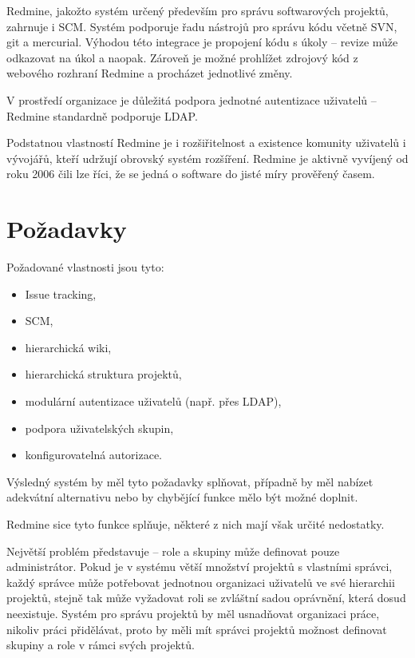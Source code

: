 \documentclass[thesis=B,czech]{FITthesis}[2012/05/02]
\begin{document}
Redmine, jakožto systém určený především pro správu softwarových
projektů, zahrnuje i \gls{SCM}. Systém podporuje řadu nástrojů pro
správu kódu včetně \gls{SVN}, \gls{git} a \gls{mercurial}. Výhodou této
integrace je propojení kódu s úkoly -- revize může odkazovat na úkol a
naopak. Zároveň je možné prohlížet zdrojový kód z webového rozhraní
Redmine a procházet jednotlivé změny.

V prostředí organizace je důležitá podpora jednotné autentizace
uživatelů -- Redmine standardně podporuje \gls{LDAP}.

Podstatnou vlastností Redmine je i rozšiřitelnost a existence komunity
uživatelů i vývojářů, kteří udržují obrovský systém rozšíření. Redmine
je aktivně vyvíjený od roku 2006 čili lze říci, že se jedná o software
do jisté míry prověřený časem.

\section{Požadavky}

Požadované vlastnosti jsou tyto:

\begin{itemize}
\item
  Issue tracking,
\item
  \gls{SCM},
\item
  hierarchická wiki,
\item
  hierarchická struktura projektů,
\item
  modulární autentizace uživatelů (např. přes \gls{LDAP}),
\item
  podpora uživatelských skupin,
\item
  konfigurovatelná autorizace.
\end{itemize}
Výsledný systém by měl tyto požadavky splňovat, případně by měl nabízet
adekvátní alternativu nebo by chybějící funkce mělo být možné doplnit.

Redmine sice tyto funkce splňuje, některé z nich mají však určité
nedostatky.

Největší problém představuje  -- role a skupiny může definovat
pouze administrátor. Pokud je v systému větší množství projektů s
vlastními správci, každý správce může potřebovat jednotnou organizaci
uživatelů ve své hierarchii projektů, stejně tak může vyžadovat roli se
zvláštní sadou oprávnění, která dosud neexistuje. Systém pro správu
projektů by měl usnadňovat organizaci práce, nikoliv práci přidělávat,
proto by měli mít správci projektů možnost definovat skupiny a role
v rámci svých projektů.
\end{document}
